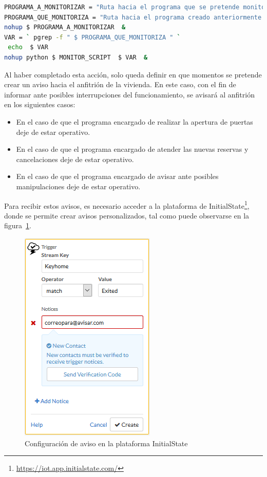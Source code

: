 \begin{lstlisting}[language=Bash,
    caption={Monitorización de un proceso en archivo .sh},
    label=src:monitorizacion-de-un-proceso-en-archivo-sh
]
PROGRAMA_A_MONITORIZAR = "Ruta hacia el programa que se pretende monitorizar" 
PROGRAMA_QUE_MONITORIZA = "Ruta hacia el programa creado anteriormente para monitorizar" 
nohup $ PROGRAMA_A_MONITORIZAR  & 
VAR = ` pgrep -f " $ PROGRAMA_QUE_MONITORIZA " `
 echo  $ VAR 
nohup python $ MONITOR_SCRIPT  $ VAR  &
\end{lstlisting}

Al haber completado esta acción, solo queda definir en que momentos se pretende crear un aviso hacia el anfitrión de la vivienda. En este caso, con el fin de informar ante posibles interrupciones del funcionamiento, se avisará al anfitrión en los siguientes casos:
\begin{itemize}
\item{En el caso de que el programa encargado de realizar la apertura de puertas deje de estar operativo.}
\item{En el caso de que el programa encargado de atender las nuevas reservas y cancelaciones deje de estar operativo.}
\item{En el caso de que el programa encargado de avisar ante posibles manipulaciones deje de estar operativo.}
\end{itemize}

Para recibir estos avisos, es necesario acceder a la plataforma de InitialState\footnote{\url{https://iot.app.initialstate.com/}}, donde se permite crear avisos personalizados, tal como puede observarse en la figura~\ref{fig:aviso-personalizado}.

\begin{figure}[tbp]
\centering
\includegraphics[scale = 0.8]{fig/Configuracion-de-aviso.PNG}
\caption{Configuración de aviso en la plataforma InitialState}
\label{fig:aviso-personalizado}
\end{figure}

